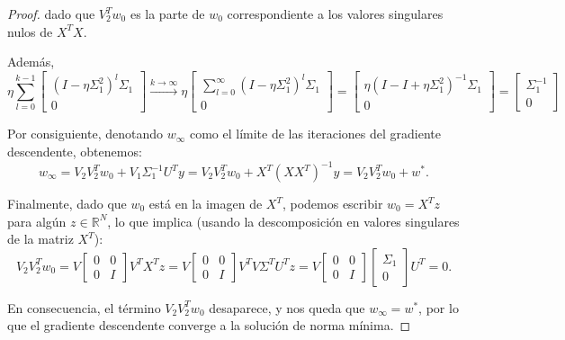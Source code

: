 \begin{proof}
    dado que $V_{2}^{T}w_0$ es la parte de $w_0$ correspondiente a los valores singulares nulos de $X^{T}X$.\newline

    Además,
    \[
        \eta \sum_{l=0}^{k-1} \begin{bmatrix} (I - \eta \Sigma_1^2)^l \Sigma_1 \\ 0 \end{bmatrix}  \xrightarrow{k \to \infty} \eta \begin{bmatrix} \sum_{l=0}^{\infty}(I - \eta \Sigma_1^2)^l \Sigma_1 \\ 0 \end{bmatrix} = \begin{bmatrix} \eta(I - I + \eta \Sigma_1^2)^{-1} \Sigma_1 \\ 0 \end{bmatrix} = \begin{bmatrix} \Sigma_1^{-1} \\ 0 \end{bmatrix}
    \]\newline

    Por consiguiente, denotando $w_\infty$ como el límite de las iteraciones del gradiente descendente, obtenemos:
    \[
        w_\infty = V_2 V_2^T w_0 + V_1 \Sigma_1^{-1} U^T y = V_2 V_2^T w_0 + X^{T}{(XX^{T})}^{-1}y = V_2 V_2^T w_0 + w^*.
    \]\newline

    Finalmente, dado que $w_0$ está en la imagen de $X^T$, podemos escribir $w_0 = X^T z$ para algún $z \in \mathbb{R}^N $, lo que implica (usando la descomposición en valores singulares de la matriz $X^{T}$):
    \[
        V_2 V_2^T w_0 = V \begin{bmatrix} 0 & 0 \\ 0 & I \end{bmatrix}V^{T}X^{T}z = V \begin{bmatrix} 0 & 0 \\ 0 & I \end{bmatrix}V^{T}V\Sigma^{T}U^{T}z = V \begin{bmatrix} 0 & 0 \\ 0 & I \end{bmatrix}\begin{bmatrix} \Sigma_1 \\ 0 \end{bmatrix}U^{T} = 0.
    \]\newline

    En consecuencia, el término $V_2 V_2^T w_0$ desaparece, y nos queda que $w_\infty = w^{*}$, por lo que el gradiente descendente converge a la solución de norma mínima.\newline
\end{proof}


